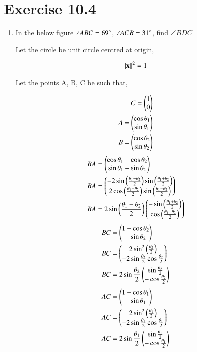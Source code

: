 \documentclass[journal,12pt,twocolumn]{IEEEtran}
\begin{document}
\section{Exercise 10.4}
\begin{enumerate}
	\item In the below figure $\angle ABC = 69\degree$, $\angle ACB = 31\degree$, find $\angle BDC$

Let the circle be unit circle centred at origin,

		\begin{align}
			\left\lVert\mathbf{x}\right\rVert^2 = 1
		\end{align}

Let the points A, B, C be such that,

		\begin{align}
			C = \begin{pmatrix}1\\0\end{pmatrix}\\
			A = \begin{pmatrix}\cos \theta_1\\\sin \theta_1\end{pmatrix}\\
			B = \begin{pmatrix}\cos \theta_2\\\sin \theta_2\end{pmatrix}
		\end{align}
		\begin{align}
			BA &= \begin{pmatrix}\cos \theta_1 - \cos \theta_2\\\sin \theta_1-\sin \theta_2\end{pmatrix}\\
			BA &= \begin{pmatrix}-2\sin \left(\frac{\theta_1-\theta_2}{2}\right) \sin \left(\frac{\theta_1+\theta_2}{2}\right)\\2\cos \left(\frac{\theta_1+\theta_2}{2}\right)\sin \left(\frac{\theta_1-\theta_2}{2}\right)\end{pmatrix}\\
			BA &= 2\sin \left(\frac{\theta_1-\theta_2}{2}\right)\begin{pmatrix}-\sin \left(\frac{\theta_1+\theta_2}{2}\right)\\\cos \left(\frac{\theta_1+\theta_2}{2}\right)\end{pmatrix}
		\end{align}
		\begin{align}
			BC &= \begin{pmatrix}1-\cos \theta_2\\-\sin \theta_2\end{pmatrix}\\
			BC &= \begin{pmatrix}2\sin^2 \left(\frac{\theta_2}{2}\right)\\-2\sin \frac{\theta_2}{2}\cos \frac{\theta_2}{2}\end{pmatrix}\\
			BC &= 2\sin \frac{\theta_2}{2} \begin{pmatrix}\sin \frac{\theta_2}{2}\\-\cos \frac{\theta_2}{2}\end{pmatrix}
		\end{align}
		\begin{align}
			AC &= \begin{pmatrix}1-\cos \theta_1\\-\sin \theta_1\end{pmatrix}\\
			AC &= \begin{pmatrix}2\sin^2 \left(\frac{\theta_1}{2}\right)\\-2\sin \frac{\theta_1}{2}\cos \frac{\theta_1}{2}\end{pmatrix}\\
			AC &= 2\sin \frac{\theta_1}{2} \begin{pmatrix}\sin \frac{\theta_1}{2}\\-\cos \frac{\theta_1}{2}\end{pmatrix}
		\end{align}


\end{enumerate}
\end{document}
